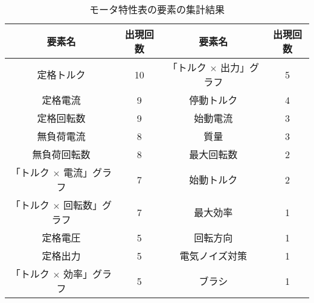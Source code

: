 \begin{table}[t]
	\centering
	\caption{モータ特性表の要素の集計結果}
	\begin{tabular}{|c|c||c|c|} \hline
		要素名 & 出現回数 & 要素名 & 出現回数 \\ \hline\hline
		定格トルク & 10 &  「トルク $\times$ 出力」グラフ & 5 \\ \hline
		定格電流 & 9 & 停動トルク & 4\\ \hline
		定格回転数 & 9 & 始動電流 & 3 \\ \hline
		無負荷電流 & 8 & 質量 & 3 \\ \hline
		無負荷回転数 & 8  &最大回転数 & 2\\ \hline
		「トルク $\times$ 電流」グラフ & 7 &  始動トルク & 2 \\ \hline
		「トルク $\times$ 回転数」グラフ & 7 & 最大効率 & 1 \\ \hline
		定格電圧 & 5 & 回転方向 & 1 \\ \hline
		定格出力 & 5 & 電気ノイズ対策 & 1 \\ \hline
		「トルク $\times$ 効率」グラフ & 5 & ブラシ & 1 \\ \hline



	\end{tabular}
	 \label{tab:syuukei}
  \end{table}

